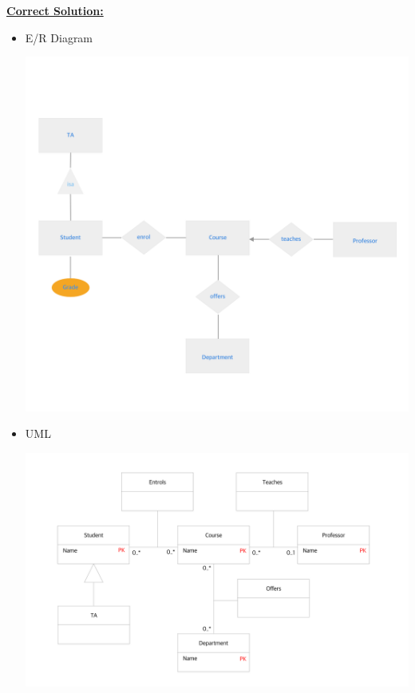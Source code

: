 \documentclass[12pt]{article}
\begin{document}
\begin{enumerate}[1.]
\begin{itemize}
    \end{itemize}

    \bigskip

    \begin{mdframed}
        \underline{\textbf{Correct Solution:}}

        \bigskip

        \begin{itemize}
            \item E/R Diagram

            \begin{center}
            \includegraphics[width=\linewidth]{images/worksheet_15_solution_19.png}
            \end{center}

            \item UML

            \begin{center}
            \includegraphics[width=\linewidth]{images/worksheet_15_solution_37.png}
            \end{center}
        \end{itemize}
    \end{mdframed}


\end{enumerate}
\end{document}
